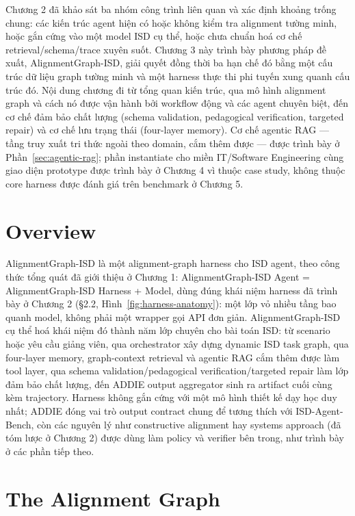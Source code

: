 \documentclass[../main.tex]{subfiles}
\begin{document}
Chương 2 đã khảo sát ba nhóm công trình liên quan và xác định khoảng trống chung: các kiến trúc agent hiện có hoặc không kiểm tra alignment tường minh, hoặc gắn cứng vào một model ISD cụ thể, hoặc chưa chuẩn hoá cơ chế retrieval/schema/trace xuyên suốt. Chương 3 này trình bày phương pháp đề xuất, AlignmentGraph-ISD, giải quyết đồng thời ba hạn chế đó bằng một cấu trúc dữ liệu graph tường minh và một harness thực thi phi tuyến xung quanh cấu trúc đó. Nội dung chương đi từ tổng quan kiến trúc, qua mô hình alignment graph và cách nó được vận hành bởi workflow động và các agent chuyên biệt, đến cơ chế đảm bảo chất lượng (schema validation, pedagogical verification, targeted repair) và cơ chế lưu trạng thái (four-layer memory). Cơ chế agentic RAG — tầng truy xuất tri thức ngoài theo domain, cắm thêm được — được trình bày ở Phần~\ref{sec:agentic-rag}; phần instantiate cho miền IT/Software Engineering cùng giao diện prototype được trình bày ở Chương 4 vì thuộc case study, không thuộc core harness được đánh giá trên benchmark ở Chương 5.

\section{Overview}

AlignmentGraph-ISD là một alignment-graph harness cho ISD agent, theo công thức tổng quát đã giới thiệu ở Chương 1: AlignmentGraph-ISD Agent = AlignmentGraph-ISD Harness + Model, dùng đúng khái niệm harness đã trình bày ở Chương 2 (§2.2, Hình~\ref{fig:harness-anatomy}): một lớp vỏ nhiều tầng bao quanh model, không phải một wrapper gọi API đơn giản. AlignmentGraph-ISD cụ thể hoá khái niệm đó thành năm lớp chuyên cho bài toán ISD: từ scenario hoặc yêu cầu giảng viên, qua orchestrator xây dựng dynamic ISD task graph, qua four-layer memory, graph-context retrieval và agentic RAG cắm thêm được làm tool layer, qua schema validation/pedagogical verification/targeted repair làm lớp đảm bảo chất lượng, đến ADDIE output aggregator sinh ra artifact cuối cùng kèm trajectory. Harness không gắn cứng với một mô hình thiết kế dạy học duy nhất; ADDIE đóng vai trò output contract chung để tương thích với ISD-Agent-Bench, còn các nguyên lý như constructive alignment hay systems approach (đã tóm lược ở Chương 2) được dùng làm policy và verifier bên trong, như trình bày ở các phần tiếp theo.

\section{The Alignment Graph}
\end{document}
